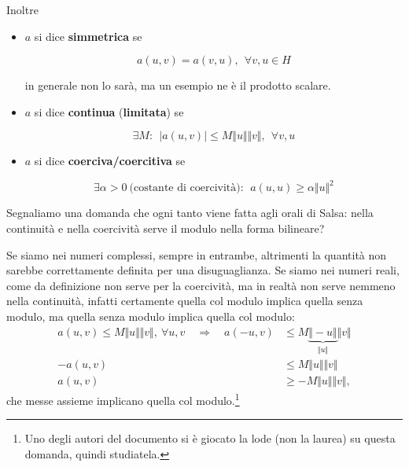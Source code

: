 \begin{definition}
    Inoltre
    \begin{itemize}
        \item $a$ si dice \textbf{simmetrica} se

              \begin{equation*}
                  a(u,v) =a(v,u),\ \ \forall v,u\in H
              \end{equation*}

              in generale non lo sarà, ma un esempio ne è il prodotto scalare.
        \item $a$ si dice \textbf{continua} (\textbf{limitata}) se

              \begin{equation*}
                  \exists M:\ \ | a(u,v)| \leq M\Vert u\Vert \Vert v\Vert,\ \ \forall v,u
              \end{equation*}
        \item $a$ si dice \textbf{coerciva/coercitiva} se

              \begin{equation*}
                  \exists \alpha  >0\ \text{(costante di coercività)} :\ \ a(u,u) \geq \alpha \Vert u\Vert ^{2}
              \end{equation*}
    \end{itemize}
\end{definition}
Segnaliamo una domanda che ogni tanto viene fatta agli orali di Salsa: nella continuità e nella coercività serve il modulo nella forma bilineare?

Se siamo nei numeri complessi, sempre in entrambe, altrimenti la quantità non sarebbe correttamente definita per una disuguaglianza.
Se siamo nei numeri reali, come da definizione non serve per la coercività, ma in realtà non serve nemmeno nella continuità, infatti certamente quella col modulo implica quella senza modulo, ma quella senza modulo implica quella col modulo:
\begin{align*}
    a(u,v)\le M \Vert u \Vert \Vert v \Vert,\ \forall u,v \quad \Rightarrow \quad a(-u,v) & \le  M \underbrace{\Vert -u \Vert}_{\Vert u \Vert} \Vert v \Vert \\
    -a(u,v)                                                                               & \le  M \Vert u \Vert \Vert v \Vert                               \\
    a(u,v)                                                                                & \ge -M \Vert u \Vert \Vert v \Vert,
\end{align*}
che messe assieme implicano quella col modulo.\footnote{Uno degli autori del documento si è giocato la lode (non la laurea) su questa domanda, quindi studiatela.}

